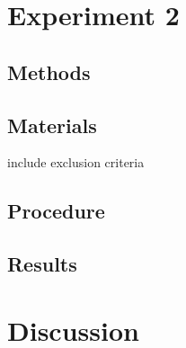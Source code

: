 \documentclass{article} \usepackage{apacite} \usepackage{graphicx} \usepackage{listings}
\begin{document}
\section{Experiment 2}

\subsection{Methods}

\subsection{Materials}

include exclusion criteria

\subsection{Procedure}

\subsection{Results}

\section{Discussion}
\end{document}
